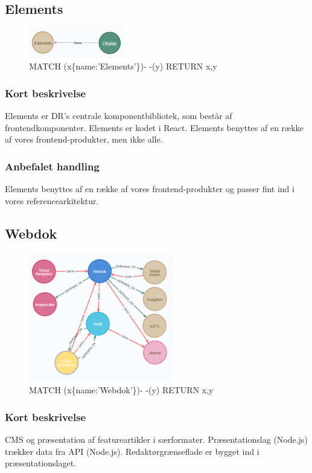\documentclass{article}
\begin{document}
\subsection{Elements}
\begin{figure}[h]
\includegraphics[width=120pt]{Elements.PNG}
\caption{MATCH (x\{name:'Elements'\})- -(y) RETURN x,y}
\end{figure}
\subsubsection{Kort beskrivelse}
Elements er DR's centrale komponentbibliotek, som består af frontendkomponenter. Elements er kodet i React. Elements benyttes af en række af vores frontend-produkter, men ikke alle.
\subsubsection{Anbefalet handling}
Elements benyttes af en række af vores frontend-produkter og passer fint ind i vores referencearkitektur.


\subsection{Webdok}
\begin{figure}[h]
\includegraphics[width=180pt]{Webdok.PNG}
\caption{MATCH (x\{name:'Webdok'\})- -(y) RETURN x,y}
\end{figure}
\subsubsection{Kort beskrivelse}
CMS og præsentation af featureartikler i særformater.	
Præsentationslag (Node.js) trækker data fra API (Node.js). Redaktørgrænseflade er bygget ind i præsentationslaget.
\end{document}
